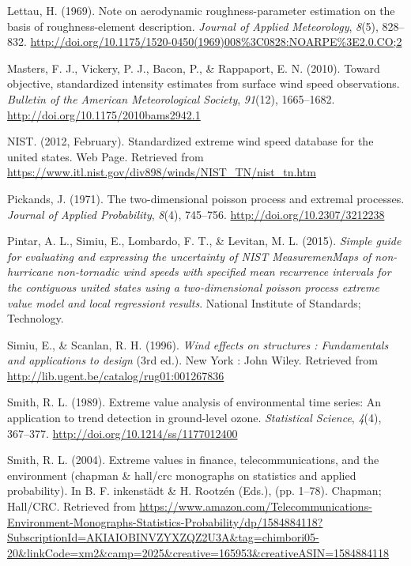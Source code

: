 \documentclass[12pt,oneside]{reedthesis}
\begin{document}
\leavevmode\hypertarget{ref-Lettau1969}{}%
Lettau, H. (1969). Note on aerodynamic roughness-parameter estimation on the basis of roughness-element description. \emph{Journal of Applied Meteorology}, \emph{8}(5), 828--832. \url{http://doi.org/10.1175/1520-0450(1969)008\%3C0828:NOARPE\%3E2.0.CO;2}

\leavevmode\hypertarget{ref-Masters2010}{}%
Masters, F. J., Vickery, P. J., Bacon, P., \& Rappaport, E. N. (2010). Toward objective, standardized intensity estimates from surface wind speed observations. \emph{Bulletin of the American Meteorological Society}, \emph{91}(12), 1665--1682. \url{http://doi.org/10.1175/2010bams2942.1}

\leavevmode\hypertarget{ref-nist2012}{}%
NIST. (2012, February). Standardized extreme wind speed database for the united states. Web Page. Retrieved from \url{https://www.itl.nist.gov/div898/winds/NIST_TN/nist_tn.htm}

\leavevmode\hypertarget{ref-Pickands1971}{}%
Pickands, J. (1971). The two-dimensional poisson process and extremal processes. \emph{Journal of Applied Probability}, \emph{8}(4), 745--756. \url{http://doi.org/10.2307/3212238}

\leavevmode\hypertarget{ref-Pintar2015}{}%
Pintar, A. L., Simiu, E., Lombardo, F. T., \& Levitan, M. L. (2015). \emph{Simple guide for evaluating and expressing the uncertainty of NIST MeasuremenMaps of non-hurricane non-tornadic wind speeds with specified mean recurrence intervals for the contiguous united states using a two-dimensional poisson process extreme value model and local regressiont results}. National Institute of Standards; Technology.

\leavevmode\hypertarget{ref-Simiu1996}{}%
Simiu, E., \& Scanlan, R. H. (1996). \emph{Wind effects on structures : Fundamentals and applications to design} (3rd ed.). New York : John Wiley. Retrieved from \url{http://lib.ugent.be/catalog/rug01:001267836}

\leavevmode\hypertarget{ref-Smith1989}{}%
Smith, R. L. (1989). Extreme value analysis of environmental time series: An application to trend detection in ground-level ozone. \emph{Statistical Science}, \emph{4}(4), 367--377. \url{http://doi.org/10.1214/ss/1177012400}

\leavevmode\hypertarget{ref-Smith2004}{}%
Smith, R. L. (2004). Extreme values in finance, telecommunications, and the environment (chapman \& hall/crc monographs on statistics and applied probability). In B. F. inkenstädt \& H. Rootzén (Eds.), (pp. 1--78). Chapman; Hall/CRC. Retrieved from \url{https://www.amazon.com/Telecommunications-Environment-Monographs-Statistics-Probability/dp/1584884118?SubscriptionId=AKIAIOBINVZYXZQZ2U3A\&tag=chimbori05-20\&linkCode=xm2\&camp=2025\&creative=165953\&creativeASIN=1584884118}


\end{document}
